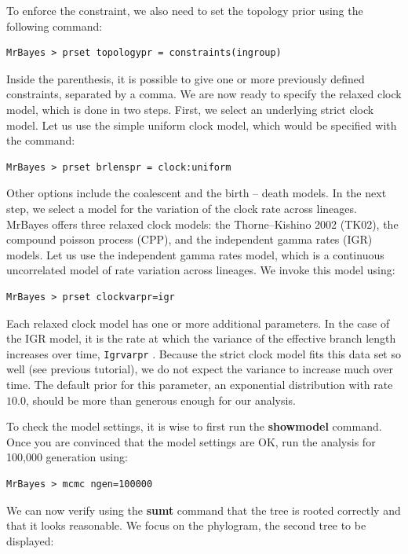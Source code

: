 \documentclass[12pt]{book}
\newcommand{\ttt}[1]{\texttt{#1} }
\begin{document}
To enforce the constraint, we also need to set the topology prior using the following command:

\begin{verbatim}
MrBayes > prset topologypr = constraints(ingroup)
\end{verbatim}

Inside the parenthesis, it is possible to give one or more previously defined constraints, separated by a comma.
We are now ready to specify the relaxed clock model, which is done in two steps. First, we select an underlying
strict clock model. Let us use the simple uniform clock model, which would be specified with the command:

\begin{verbatim}
MrBayes > prset brlenspr = clock:uniform
\end{verbatim}

Other options include the coalescent and the birth -- death models. In the next step, we select a model for the
variation of the clock rate across lineages. MrBayes offers three relaxed clock models: the Thorne--Kishino 2002
(TK02), the compound poisson process (CPP), and the independent gamma rates (IGR) models. Let us use
the independent gamma rates model, which is a continuous uncorrelated model of rate variation across lineages.
We invoke this model using:

\begin{verbatim}
MrBayes > prset clockvarpr=igr
\end{verbatim}

Each relaxed clock model has one or more additional parameters. In the case of the IGR model, it is the rate
at which the variance of the effective branch length increases over time, \ttt{Igrvarpr}. Because the strict clock
model fits this data set so well (see previous tutorial), we do not expect the variance to increase much over time.
The default prior for this parameter, an exponential distribution with rate $10.0$, should be more than generous
enough for our analysis.

To check the model settings, it is wise to first run the \textbf{showmodel} command. Once you are convinced that
the model settings are OK, run the analysis for 100,000 generation using:

\begin{verbatim}
MrBayes > mcmc ngen=100000
\end{verbatim}

We can now verify using the \textbf{sumt} command that the tree is rooted correctly and that it looks reasonable.
We focus on the phylogram, the second tree to be displayed:
\end{document}
